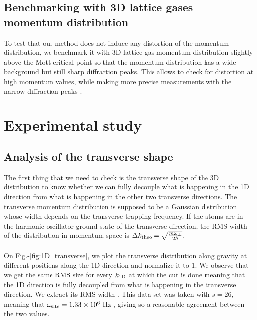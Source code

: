 \subsection{Benchmarking with 3D lattice gases momentum distribution}

To test that our method does not induce any distortion of the momentum distribution, we benchmark it with 3D lattice gas momentum distribution slightly above the Mott critical point so that the momentum distribution has a wide background but still sharp diffraction peaks. This allows to check for distortion at high momentum values, while making more precise measurements with the narrow diffraction peaks .





\section{Experimental study}

\subsection{Analysis of the transverse shape}

The first thing that we need to check is the transverse shape of the 3D distribution to know whether we can fully decouple what is happening in the 1D direction from what is happening in the other two transverse directions. The transverse momentum distribution is supposed to be a Gaussian distribution whose width depends on the transverse trapping frequency. If the atoms are in the harmonic oscillator ground state of the transverse direction, the RMS width of the distribution in momentum space is $\Delta k_{\rm{theo}}=\sqrt{\frac{m \omega_{\perp}}{2 \hbar}}$. 
\paragraph{} On Fig.-\ref{fig:1D_transverse}, we plot the transverse distribution along gravity at different positions along the 1D direction and normalize it to 1. We observe that we get the same RMS size for every $k_{\rm{1D}}$ at which the cut is done meaning that the 1D direction is fully decoupled from what is happening in the transverse direction. We extract its RMS width . This data set was taken with $s=26$, meaning that $\omega_{\rm{site}}=1.33 \times 10^6$ Hz , giving  so a reasonable agreement between the two values. 

